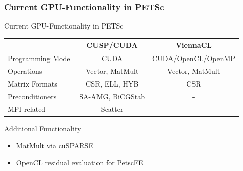 \begin{frame}[fragile]
\frametitle{Current GPU-Functionality in PETSc}
  
  \begin{block}{Current GPU-Functionality in PETSc}
  \begin{center}
  \renewcommand{\arraystretch}{1.2}
  \begin{tabular}{|l|c|c|}
   \hline
                     & \textbf{CUSP/CUDA}  & \textbf{ViennaCL} \\
   \hline
   Programming Model & CUDA  & CUDA/OpenCL/OpenMP \\
   \hline
   Operations        & Vector, MatMult & Vector, MatMult \\
   \hline
   Matrix Formats    & CSR, ELL, HYB  & CSR \\
   \hline
   Preconditioners   & SA-AMG, BiCGStab & - \\
   \hline
   MPI-related       & Scatter & - \\
   \hline
  \end{tabular}
  \end{center}
  \end{block}

  \begin{block}{Additional Functionality}
   \begin{itemize}
    \item MatMult via cuSPARSE
    \item OpenCL residual evaluation for PetscFE
   \end{itemize}
  \end{block}


\end{frame}


